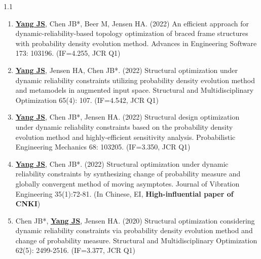 \documentclass{resume}
\begin{document}
\begin{spacing}{1.1}
\begin{enumerate} [itemsep=3pt,topsep=2pt]
  \item \underline{\textbf{Yang JS}}, Chen JB*, Beer M, Jensen HA. (2022) An efficient approach for dynamic-reliability-based topology optimization of braced frame structures with probability density evolution method. Advances in Engineering Software 173: 103196. (IF=4.255, JCR Q1)

  \item \underline{\textbf{Yang JS}}, Jensen HA, Chen JB*. (2022) Structural optimization under dynamic reliability constraints utilizing probability density evolution method and metamodels in augmented input space. Structural and Multidisciplinary Optimization 65(4): 107. (IF=4.542, JCR Q1)
  
  \item \underline{\textbf{Yang JS}}, Chen JB*, Jensen HA. (2022) Structural design optimization under dynamic reliability constraints based on the probability density evolution method and highly-efficient sensitivity analysis. Probabilistic Engineering Mechanics 68: 103205.
  (IF=3.350, JCR Q1)

  \item \underline{\textbf{Yang JS}}, Chen JB*. (2022) Structural optimization under dynamic reliability constraints by synthesizing change of probability measure and globally convergent method of moving asymptotes. Journal of Vibration Engineering 35(1):72-81. (In Chinese, EI, \textbf{High-influential paper of CNKI})

  \item Chen JB*, \underline{\textbf{Yang JS}}, Jensen HA. (2020) Structural optimization considering dynamic reliability constraints via probability density evolution method and change of probability measure. Structural and Multidisciplinary Optimization 62(5): 2499-2516. (IF=3.377, JCR Q1)  
\end{enumerate}
\end{spacing}
\end{document}
